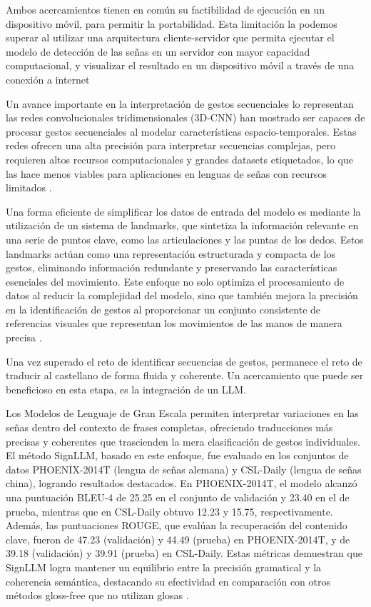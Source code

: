 \documentclass{article}
\begin{document}
Ambos acercamientos tienen en común su factibilidad de ejecución en un dispositivo móvil, para permitir la portabilidad. Esta limitación la podemos superar al utilizar una arquitectura cliente-servidor que permita ejecutar el modelo de detección de las señas en un servidor con mayor capacidad computacional, y visualizar el resultado en un dispositivo móvil a través de una conexión a internet

Un avance importante en la interpretación de gestos secuenciales lo representan las redes convolucionales tridimensionales (3D-CNN) han mostrado ser capaces de procesar gestos secuenciales al modelar características espacio-temporales. Estas redes ofrecen una alta precisión para interpretar secuencias complejas, pero requieren altos recursos computacionales y grandes datasets etiquetados, lo que las hace menos viables para aplicaciones en lenguas de señas con recursos limitados \cite{cita9}.

Una forma eficiente de simplificar los datos de entrada del modelo es mediante la utilización de un sistema de landmarks, que sintetiza la información relevante en una serie de puntos clave, como las articulaciones y las puntas de los dedos. Estos landmarks actúan como una representación estructurada y compacta de los gestos, eliminando información redundante y preservando las características esenciales del movimiento. Este enfoque no solo optimiza el procesamiento de datos al reducir la complejidad del modelo, sino que también mejora la precisión en la identificación de gestos al proporcionar un conjunto consistente de referencias visuales que representan los movimientos de las manos de manera precisa \cite{cita6}.

Una vez superado el reto de identificar secuencias de gestos, permanece el reto de traducir al castellano de forma fluida y coherente. Un acercamiento que puede ser beneficioso en esta etapa, es la integración de un LLM. 

Los Modelos de Lenguaje de Gran Escala permiten interpretar variaciones en las señas dentro del contexto de frases completas, ofreciendo traducciones más precisas y coherentes que trascienden la mera clasificación de gestos individuales. El método SignLLM, basado en este enfoque, fue evaluado en los conjuntos de datos PHOENIX-2014T (lengua de señas alemana) y CSL-Daily (lengua de señas china), logrando resultados destacados. En PHOENIX-2014T, el modelo alcanzó una puntuación BLEU-4 de 25.25 en el conjunto de validación y 23.40 en el de prueba, mientras que en CSL-Daily obtuvo 12.23 y 15.75, respectivamente. Además, las puntuaciones ROUGE, que evalúan la recuperación del contenido clave, fueron de 47.23 (validación) y 44.49 (prueba) en PHOENIX-2014T, y de 39.18 (validación) y 39.91 (prueba) en CSL-Daily. Estas métricas demuestran que SignLLM logra mantener un equilibrio entre la precisión gramatical y la coherencia semántica, destacando su efectividad en comparación con otros métodos gloss-free que no utilizan glosas \cite{cita10}.
\end{document}
